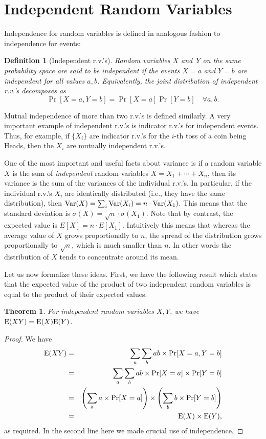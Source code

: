 \documentclass[11pt]{article}
\def\Ex#1{{\rm E}(#1)}
\def\Var#1{{\rm Var}(#1)}
\newcounter{thm}
\newtheorem{theorem}{Theorem}[thm]
\newtheorem{definition}{Definition}[thm]
\begin{document}
\section*{Independent Random Variables}
Independence for random variables is defined in analogous fashion
to independence for events:
\begin{definition}[Independent r.v.'s]
Random variables $X$ and~$Y$ on the same probability space are said to be {\it independent\/}
if the events $X=a$ and $Y=b$ are independent for all values $a,b$. Equivalently, the joint distribution of independent r.v.'s decomposes as
$$\Pr[X=a,Y=b] = \Pr[X=a]\Pr[Y=b] \quad \forall a,b.$$
\end{definition}%

Mutual independence of more than two r.v.'s is defined similarly.
A very important example of independent r.v.'s is indicator r.v.'s
for independent events. Thus, for example, if $\{X_i\}$ are
indicator r.v.'s for the $i$-th toss of a coin being Heads,
then the $X_i$ are mutually independent r.v.'s.

One of the most important and useful facts about variance is if 
a random variable $X$ is the sum of {\em independent} random
variables $X = X_1 + \cdots + X_n$, then its variance is the sum of the variances of the 
individual r.v.'s. In particular, if the individual r.v.'s $X_i$ are
identically distributed (i.e., they have the same distribution), then $\Var{X} = \sum_i \Var{X_i} = n \cdot \Var{X_1}$. 
This means that the standard deviation is $\sigma(X) = \sqrt{n} \cdot \sigma(X_1)$. 
Note that by contrast, the expected value is $E[X] = n \cdot E[X_1]$. Intuitively this 
means that whereas the average value of $X$ grows proportionally to $n$, the 
spread of the distribution grows proportionally to $\sqrt{n}$, which is much smaller than $n$. In other words the 
distribution of $X$ tends to concentrate around its mean.

Let us now formalize these ideas. First, we have the following result which states
that the expected value of the product of two independent random variables
is equal to the product of their expected values.

\begin{theorem}\label{thm:indepexp}
For {\em independent} random variables $X,Y$, we have $\Ex{XY}=\Ex{X}\Ex{Y}$.
\end{theorem}
\begin{proof}
We have
\begin{eqnarray*}
   \Ex{XY} & = & \sum_a\sum_b ab\times\Pr[X=a, Y=b] \\
                  &=& \sum_a\sum_b ab\times\Pr[X=a]\times\Pr[Y=b] \\
                  &=& \left(\sum_a a\times\Pr[X=a]\right)\times \left(\sum_b b\times\Pr[Y=b]\right)\\
                  &=& \Ex{X}\times\Ex{Y},
\end{eqnarray*}
as required.  In the second line here we made crucial use of independence.
\end{proof}
\end{document}
